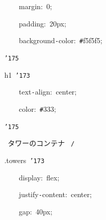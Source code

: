 \documentclass[a4paper,10pt]{article}
\def\mc{\relax}
\begin{document}
\noindent
\mbox{}{\tt\mc \ }{\tt\mc \ }{\tt\mc \ }{\tt\mc \ }{\tt\mc \ }{\tt\mc \ }{\tt\mc \ }{\tt\mc \ }{\tt\mc \ }{\tt\mc \ }{\tt\mc \ }{\tt\mc \ }margin:{\tt\mc \ }0;

\noindent
\mbox{}{\tt\mc \ }{\tt\mc \ }{\tt\mc \ }{\tt\mc \ }{\tt\mc \ }{\tt\mc \ }{\tt\mc \ }{\tt\mc \ }{\tt\mc \ }{\tt\mc \ }{\tt\mc \ }{\tt\mc \ }padding:{\tt\mc \ }20px;

\noindent
\mbox{}{\tt\mc \ }{\tt\mc \ }{\tt\mc \ }{\tt\mc \ }{\tt\mc \ }{\tt\mc \ }{\tt\mc \ }{\tt\mc \ }{\tt\mc \ }{\tt\mc \ }{\tt\mc \ }{\tt\mc \ }background{\tt -}color:{\tt\mc \ }{\tt\#}f5f5f5;

\noindent
\mbox{}{\tt\mc \ }{\tt\mc \ }{\tt\mc \ }{\tt\mc \ }{\tt\mc \ }{\tt\mc \ }{\tt\mc \ }{\tt\mc \ }{\tt\char'175}

\noindent
\mbox{}{\tt\mc \ }{\tt\mc \ }{\tt\mc \ }{\tt\mc \ }{\tt\mc \ }{\tt\mc \ }{\tt\mc \ }{\tt\mc \ }h1{\tt\mc \ }{\tt\char'173}

\noindent
\mbox{}{\tt\mc \ }{\tt\mc \ }{\tt\mc \ }{\tt\mc \ }{\tt\mc \ }{\tt\mc \ }{\tt\mc \ }{\tt\mc \ }{\tt\mc \ }{\tt\mc \ }{\tt\mc \ }{\tt\mc \ }text{\tt -}align:{\tt\mc \ }center;

\noindent
\mbox{}{\tt\mc \ }{\tt\mc \ }{\tt\mc \ }{\tt\mc \ }{\tt\mc \ }{\tt\mc \ }{\tt\mc \ }{\tt\mc \ }{\tt\mc \ }{\tt\mc \ }{\tt\mc \ }{\tt\mc \ }color:{\tt\mc \ }{\tt\#}333;

\noindent
\mbox{}{\tt\mc \ }{\tt\mc \ }{\tt\mc \ }{\tt\mc \ }{\tt\mc \ }{\tt\mc \ }{\tt\mc \ }{\tt\mc \ }{\tt\char'175}

\noindent
\mbox{}{\tt\mc \ }{\tt\mc \ }{\tt\mc \ }{\tt\mc \ }{\tt\mc \ }{\tt\mc \ }{\tt\mc \ }{\tt\mc \ }\rm\mc {\tt /}{\tt *}\  タワーのコンテナ \rm\mc \ {\tt *}{\tt /}
\tt\mc 

\noindent
\mbox{}{\tt\mc \ }{\tt\mc \ }{\tt\mc \ }{\tt\mc \ }{\tt\mc \ }{\tt\mc \ }{\tt\mc \ }{\tt\mc \ }.towers{\tt\mc \ }{\tt\char'173}

\noindent
\mbox{}{\tt\mc \ }{\tt\mc \ }{\tt\mc \ }{\tt\mc \ }{\tt\mc \ }{\tt\mc \ }{\tt\mc \ }{\tt\mc \ }{\tt\mc \ }{\tt\mc \ }{\tt\mc \ }{\tt\mc \ }display:{\tt\mc \ }flex;

\noindent
\mbox{}{\tt\mc \ }{\tt\mc \ }{\tt\mc \ }{\tt\mc \ }{\tt\mc \ }{\tt\mc \ }{\tt\mc \ }{\tt\mc \ }{\tt\mc \ }{\tt\mc \ }{\tt\mc \ }{\tt\mc \ }justify{\tt -}content:{\tt\mc \ }center;

\noindent
\mbox{}{\tt\mc \ }{\tt\mc \ }{\tt\mc \ }{\tt\mc \ }{\tt\mc \ }{\tt\mc \ }{\tt\mc \ }{\tt\mc \ }{\tt\mc \ }{\tt\mc \ }{\tt\mc \ }{\tt\mc \ }gap:{\tt\mc \ }40px;
\end{document}
